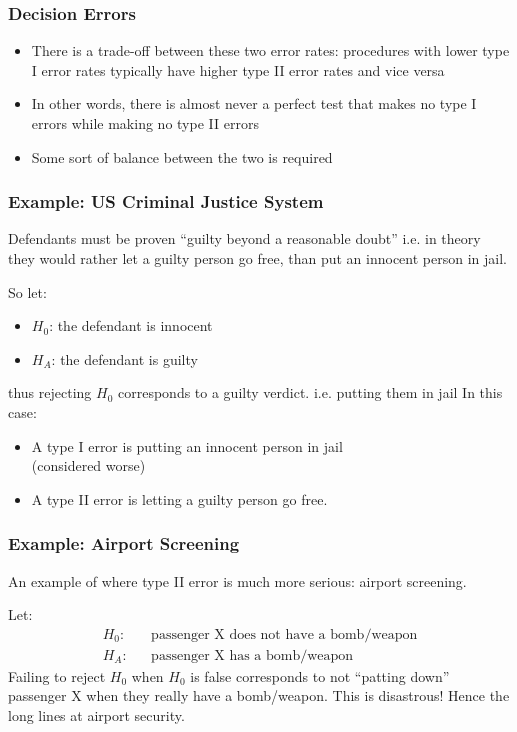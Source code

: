 \documentclass[handout]{beamer}
\newcommand{\blue}[1]{\textcolor{blue2}{#1}}
\begin{document}
\begin{frame}
\frametitle{Decision Errors}
\begin{itemize}
\item There is a trade-off between these two error rates: procedures with lower type I error rates typically have higher type II error rates and vice versa
\pause \item In other words, there is almost never a perfect test that makes no type I errors while making no type II errors
\pause \item Some sort of balance between the two is required
\end{itemize}
\end{frame}



\begin{frame}
\frametitle{Example:  US Criminal Justice System}
Defendants must be proven ``guilty beyond a reasonable doubt''  i.e. \blue{in theory} they would rather let a guilty person go free, than put an innocent person in jail.

\vskip 0.25cm
\pause So let:
\begin{itemize}
\item $H_0$: the defendant is innocent
\item $H_A$: the defendant is guilty
\end{itemize}
\pause thus rejecting $H_0$ corresponds to a guilty verdict.  i.e. putting them in jail
\vskip 0.25cm
\pause In this case:
\begin{itemize}
\item A type I error is putting an innocent person in jail\\
(considered worse)
\item A type II error is letting a guilty person go free.  
\end{itemize}
\end{frame}



\begin{frame}
\frametitle{Example:  Airport Screening}
An example of where type II error is much more serious:  \blue{airport screening}.  

\vskip 0.25cm
\pause Let:
\begin{eqnarray*}
H_0: && \mbox{passenger X does not have a bomb/weapon}\\
H_A: && \mbox{passenger X has a bomb/weapon}
\end{eqnarray*}
\pause Failing to reject $H_0$ when $H_0$ is false corresponds to not ``patting down'' passenger X when they really have a bomb/weapon.  This is disastrous!
\vskip 0.25cm
\pause Hence the long lines at airport security.  
\end{frame}
\end{document}
